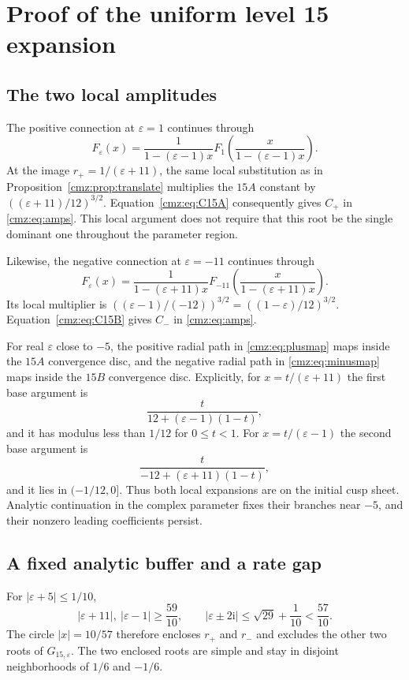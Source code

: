 \documentclass[11pt,letterpaper]{article}
\numberwithin{equation}{section}
\theoremstyle{definition}\newtheorem{definition}[theorem]{Definition}
\theoremstyle{remark}\newtheorem{remark}[theorem]{Remark}
\newcommand{\eps}{\varepsilon}
\newcommand{\ii}{\mathrm i}
\begin{document}
\section{Proof of the uniform level 15 expansion}
\label{cmz:sec:uniformproof}
\subsection{The two local amplitudes}
The positive connection at $\eps=1$ continues through
\begin{equation}
F_\eps(x)=\frac1{1-(\eps-1)x}
 F_1\!\left(\frac{x}{1-(\eps-1)x}\right).
\label{cmz:eq:plusmap}
\end{equation}
At the image $r_+=1/(\eps+11)$, the same local substitution as in Proposition~\ref{cmz:prop:translate} multiplies the $15A$ constant by $((\eps+11)/12)^{3/2}$. Equation~\eqref{cmz:eq:C15A} consequently gives $C_+$ in \eqref{cmz:eq:amps}. This local argument does not require that this root be the single dominant one throughout the parameter region.

Likewise, the negative connection at $\eps=-11$ continues through
\begin{equation}
F_\eps(x)=\frac1{1-(\eps+11)x}
 F_{-11}\!\left(\frac{x}{1-(\eps+11)x}\right).
\label{cmz:eq:minusmap}
\end{equation}
Its local multiplier is $((\eps-1)/(-12))^{3/2}=((1-\eps)/12)^{3/2}$. Equation~\eqref{cmz:eq:C15B} gives $C_-$ in \eqref{cmz:eq:amps}.

For real $\eps$ close to $-5$, the positive radial path in \eqref{cmz:eq:plusmap} maps inside the $15A$ convergence disc, and the negative radial path in \eqref{cmz:eq:minusmap} maps inside the $15B$ convergence disc. Explicitly, for $x=t/(\eps+11)$ the first base argument is
\[
\frac{t}{12+(\eps-1)(1-t)},
\]
and it has modulus less than $1/12$ for $0\leq t<1$. For $x=t/(\eps-1)$ the second base argument is
\[
\frac{t}{-12+(\eps+11)(1-t)},
\]
and it lies in $(-1/12,0]$. Thus both local expansions are on the initial cusp sheet. Analytic continuation in the complex parameter fixes their branches near $-5$, and their nonzero leading coefficients persist.

\subsection{A fixed analytic buffer and a rate gap}
For $|\eps+5|\leq1/10$,
\begin{equation}
|\eps+11|,\ |\eps-1|\geq\frac{59}{10},\qquad
|\eps\pm2\ii|\leq\sqrt{29}+\frac1{10}<\frac{57}{10}.
\label{cmz:eq:gapclosed}
\end{equation}
The circle $|x|=10/57$ therefore encloses $r_+$ and $r_-$ and excludes the other two roots of $G_{15,\eps}$. The two enclosed roots are simple and stay in disjoint neighborhoods of $1/6$ and $-1/6$.
\end{document}
